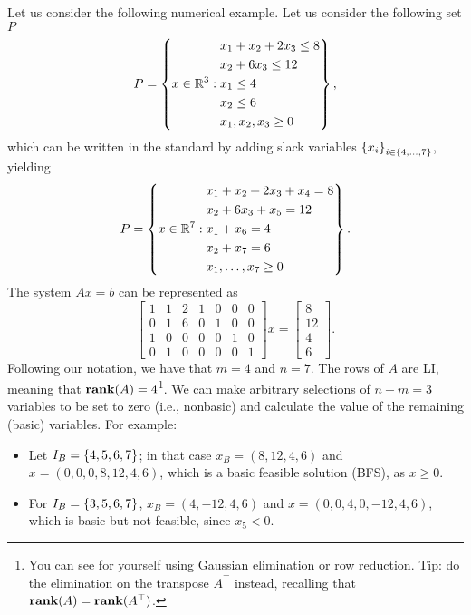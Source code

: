 Let us consider the following numerical example. Let us consider the following set $P$
%
\begin{equation}  \label{p1c3:eq:example_P}
	P = \left\{x \in \mathbb{R}^3 :  
		\begin{aligned}
			& x_1 + x_2 + 2x_3 \le 8 \\
			& x_2 + 6 x_3 \le 12 \\
			& x_1 \le 4 \\
			& x_2 \le 6 \\
			& x_1, x_2, x_3 \ge 0
		\end{aligned}
		\right\}, 	
\end{equation}
%
which can be written in the standard by adding slack variables $\left\{ x_i \right \}_{i \in \{4,\dots,7\}}$, yielding 
%
\begin{equation}  \label{p1c3:eq:example_P}
	P = \left\{x \in \mathbb{R}^7 :  
		\begin{aligned}
			& x_1 + x_2 + 2x_3 + x_4 = 8 \\
			& x_2 + 6 x_3 + x_5 = 12 \\
			& x_1 + x_6 = 4 \\
			& x_2 + x_7 =6 \\
			& x_1, \dots, x_7 \ge 0
		\end{aligned}
		\right\}. 	
\end{equation}
%
The system $Ax=b$ can be represented as 
%  
\begin{equation*}
	\begin{bmatrix}
		1 & 1 & 2 & 1 & 0 & 0 & 0 \\
		0 & 1 & 6 & 0 & 1 & 0 & 0 \\
		1 & 0 & 0 & 0 & 0 & 1 & 0 \\
		0 & 1 & 0 & 0 & 0 & 0 & 1
	\end{bmatrix} x =
	\begin{bmatrix}
		8  \\
		12 \\
		4  \\
		6   	
	\end{bmatrix}.
\end{equation*}
%
Following our notation, we have that $m = 4$ and $n = 7$. The rows of $A$ are LI, meaning that $\mathop{\bf rank}(A) = 4$\footnote{You can see for yourself using Gaussian elimination or row reduction. Tip: do the elimination on the transpose $A^\top$ instead, recalling that $\mathop{\bf rank}(A) = \mathop{\bf rank}(A^\top)$.}. We can make arbitrary selections of $n-m = 3$ variables to be set to zero (i.e., nonbasic) and calculate the value of the remaining (basic) variables. For example:
\begin{itemize}
	\item Let $I_B = \left\{ 4, 5, 6, 7 \right \}$; in that case $x_B = (8,12,4,6)$ and $x = (0,0,0,8,12,4,6)$, which is a basic feasible solution (BFS), as $x \geq 0$.
	\item For $I_B = \left\{ 3,5,6,7 \right \}$, $x_B = (4,-12,4,6)$ and $x = (0, 0, 4, 0, -12, 4, 6)$, which is basic but not feasible, since $x_5 < 0$.	
\end{itemize}



